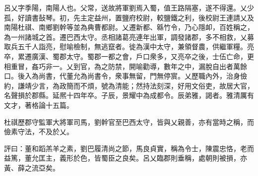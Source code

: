 \begin{pinyinscope}
 
 
 呂乂字季陽，南陽人也。父常，送故將軍劉焉入蜀，值王路隔塞，遂不得還。乂少孤，好讀書鼔琴。初，先主定益州，置鹽府校尉，較鹽鐵之利，後校尉王連請乂及南陽杜祺、南鄉劉幹等並為典曹都尉。乂遷新都、緜竹令，乃心隱卹，百姓稱之，為一州諸城之首。遷巴西太守。丞相諸葛亮連年出軍，調發諸郡，多不相救，乂募取兵五千人詣亮，慰喻檢制，無逃竄者。徙為漢中太守，兼領督農，供繼軍糧。亮卒，累遷廣漢、蜀郡太守。蜀郡一都之會，戶口衆多，又亮卒之後，士伍亡命，更相重冒，姦巧非一。乂到官，為之防禁，開喻勸導，數年之中，漏脫自出者萬餘口。後入為尚書，代董允為尚書令，衆事無留，門無停賔。乂歷職內外，治身儉約，謙靖少言，為政簡而不煩，號為清能；然持法刻深，好用文俗吏，故居大官，名聲損於郡縣。延熈十四年卒。子辰，景耀中為成都令。辰弟雅，謁者。雅清厲有文才，著格論十五篇。
 
 
 
 
 杜祺歷郡守監軍大將軍司馬，劉幹官至巴西太守，皆與乂親善，亦有當時之稱，而儉素守法，不及於乂。
 
 
 
 
 評曰：董和蹈羔羊之素，劉巴履清尚之節，馬良貞實，稱為令士，陳震忠恪，老而益篤，董允匡主，義形於色，皆蜀臣之良矣。呂乂臨郡則垂稱，處朝則被損，亦黃、薛之流亞矣。
 
 
\end{pinyinscope}